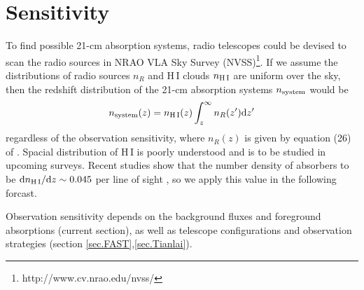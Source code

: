 \documentclass[]{raa}
\newcommand{\diff}{{\rm d}}
\newcommand{\HI}{{H{\small\,I}}}
\begin{document}
\section{Sensitivity}\label{sec.sensitivity}
To find possible 21-cm absorption systems, radio telescopes
could be devised to scan the radio sources in
NRAO VLA Sky Survey (NVSS)\footnote{http://www.cv.nrao.edu/nvss/}.
If we assume the distributions of radio sources $n_R$ and
{\HI} clouds $n_{\rm \HI}$ are uniform over the sky, then the redshift
distribution of the 21-cm absorption systems $n_{\rm system}$ would be
\begin{equation}
    n_{\rm system}(z)=n_{\rm \HI}(z)\int_z^\infty n_R(z')\diff z'
\end{equation}
regardless of the observation sensitivity,
where $n_R(z)$ is given by equation (26) of \cite{2010A&ARv..18....1D}.
Spacial distribution of {\HI} is poorly understood and is to be
studied in upcoming surveys.
Recent studies show that the number density of
absorbers to be $\diff n_{\rm \HI}/\diff z\sim 0.045$
per line of sight
\citep{2005ARA&A..43..861W,2007ASSP....3..501Z}, so we apply this value
in the following forcast.

Observation sensitivity depends on the background fluxes and foreground
absorptions (current section), as well as telescope configurations and
observation strategies (section \ref{sec.FAST},\ref{sec.Tianlai}).
\end{document}
